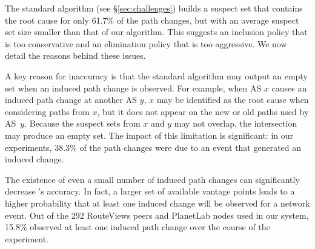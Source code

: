 
The standard  \feldmann algorithm (see \S\ref{sec:challenges}) builds a suspect set that
contains the root cause for only 61.7\% of the path changes, but with an
average suspect set size smaller than that of our algorithm.  This suggests 
an inclusion policy that is too conservative and an elimination
policy that is too aggressive.  We now detail the reasons behind  
these issues.

A key reason for inaccuracy is that the standard \feldmann algorithm may
output an empty set when an induced path change is observed.  For
example, when AS $x$ causes an induced path change at another AS $y$,
$x$ may be identified as the root cause when considering paths from $x$,
but it does not appear on the new or old paths used by AS~$y$.  Because
the suspect sets from $x$ and $y$ may not overlap, the intersection may
produce an empty set. The impact of this limitation is significant: in
our experiments, 38.3\% of the path changes were due to an event that
generated an induced change. 

The existence of even a small number of induced path changes can
significantly decrease  \feldmann's accuracy.  In fact, a
larger set of available vantage points leads to a higher probability
that at least one induced change will be observed for a network event.
Out of the 292 RouteViews peers and PlanetLab nodes used in our system,
15.8\% observed at least one induced path change over the course of the
experiment. 

